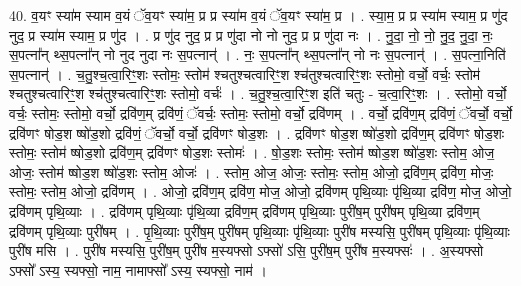 \documentclass[17pt]{extarticle}
\begin{document}
40. व॒यꣳ स्या॑म स्याम व॒यं ॅव॒यꣳ स्या॑म॒ प्र प्र स्या॑म व॒यं ॅव॒यꣳ स्या॑म॒ प्र । . स्या॒म॒ प्र प्र स्या॑म स्याम॒ प्र णु॑द नुद॒ प्र स्या॑म स्याम॒ प्र णु॑द । . प्र णु॑द नुद॒ प्र प्र णु॑दा नो नो नुद॒ प्र प्र णु॑दा नः । . नु॒दा॒ नो॒ नो॒ नु॒द॒ नु॒दा॒ नः॒ स॒पत्ना᳚न् थ्स॒पत्ना᳚न् नो नुद नुदा नः स॒पत्नान्॑ । . नः॒ स॒पत्ना᳚न् थ्स॒पत्ना᳚न् नो नः स॒पत्नान्॑ । . स॒पत्ना॒निति॑ स॒पत्नान्॑ । . च॒तु॒श्च॒त्वा॒रिꣳ॒॒शः स्तोमः॒ स्तोम॑ श्चतुश्चत्वारिꣳ॒॒श श्च॑तुश्चत्वारिꣳ॒॒शः स्तोमो॒ वर्चो॒ वर्चः॒ स्तोम॑ श्चतुश्चत्वारिꣳ॒॒श श्च॑तुश्चत्वारिꣳ॒॒शः स्तोमो॒ वर्चः॑ । . च॒तु॒श्च॒त्वा॒रिꣳ॒॒श इति॑ चतुः - च॒त्वा॒रिꣳ॒॒शः । . स्तोमो॒ वर्चो॒ वर्चः॒ स्तोमः॒ स्तोमो॒ वर्चो॒ द्रवि॑ण॒म् द्रवि॑णं॒ ॅवर्चः॒ स्तोमः॒ स्तोमो॒ वर्चो॒ द्रवि॑णम् । . वर्चो॒ द्रवि॑ण॒म् द्रवि॑णं॒ ॅवर्चो॒ वर्चो॒ द्रवि॑णꣳ षोड॒श ष्षो॑ड॒शो द्रवि॑णं॒ ॅवर्चो॒ वर्चो॒ द्रवि॑णꣳ षोड॒शः । . द्रवि॑णꣳ षोड॒श ष्षो॑ड॒शो द्रवि॑ण॒म् द्रवि॑णꣳ षोड॒शः स्तोमः॒ स्तोम॑ ष्षोड॒शो द्रवि॑ण॒म् द्रवि॑णꣳ षोड॒शः स्तोमः॑ । . षो॒ड॒शः स्तोमः॒ स्तोम॑ ष्षोड॒श ष्षो॑ड॒शः स्तोम॒ ओज॒ ओजः॒ स्तोम॑ ष्षोड॒श ष्षो॑ड॒शः स्तोम॒ ओजः॑ । . स्तोम॒ ओज॒ ओजः॒ स्तोमः॒ स्तोम॒ ओजो॒ द्रवि॑ण॒म् द्रवि॑ण॒ मोजः॒ स्तोमः॒ स्तोम॒ ओजो॒ द्रवि॑णम् । . ओजो॒ द्रवि॑ण॒म् द्रवि॑ण॒ मोज॒ ओजो॒ द्रवि॑णम् पृथि॒व्याः पृ॑थि॒व्या द्रवि॑ण॒ मोज॒ ओजो॒ द्रवि॑णम् पृथि॒व्याः । . द्रवि॑णम् पृथि॒व्याः पृ॑थि॒व्या द्रवि॑ण॒म् द्रवि॑णम् पृथि॒व्याः पुरी॑ष॒म् पुरी॑षम् पृथि॒व्या द्रवि॑ण॒म् द्रवि॑णम् पृथि॒व्याः पुरी॑षम् । . पृ॒थि॒व्याः पुरी॑ष॒म् पुरी॑षम् पृथि॒व्याः पृ॑थि॒व्याः पुरी॑ष मस्यसि॒ पुरी॑षम् पृथि॒व्याः पृ॑थि॒व्याः पुरी॑ष मसि । . पुरी॑ष मस्यसि॒ पुरी॑ष॒म् पुरी॑ष म॒स्यफ्सो ऽफ्सो॑ ऽसि॒ पुरी॑ष॒म् पुरी॑ष म॒स्यफ्सः॑ । . अ॒स्यफ्सो ऽफ्सो᳚ ऽस्य॒ स्यफ्सो॒ नाम॒ नामाफ्सो᳚ ऽस्य॒ स्यफ्सो॒ नाम॑ । \newline
\pagebreak
{}
\end{document}

